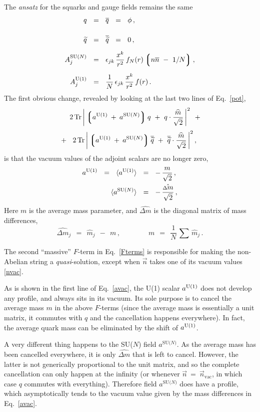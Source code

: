 \documentclass[12pt]{article}
\def\beq{\begin{equation}}
\def\eeq{\end{equation}}
\newcommand{\wt}{\widetilde}
\newcommand{\ov}{\overline}
\newcommand{\lgr}{\left\lgroup}
\newcommand{\rgr}{\right\rgroup}
\newcommand{\aU}{a^{\rm U(1)}}
\newcommand{\aN}{a^\text{SU($N$)}}
\newcommand{\nnbar}{n\ov{n}}
\newcommand{\qt}{\wt{q}}
\newcommand{\bq}{\ov{q}}
\newcommand{\bqt}{\overline{\widetilde{q}}}
\newcommand{\Tr}{\text{Tr}}
\newcommand{\dm}{\hat{{\scriptstyle \Delta} m}}
\newcommand{\mhat}{\widehat{m}}
\newcommand{\nvac}{\vec{n}{}_\text{vac}}
\newcommand{\ansatz}{{\it ansatz} }
\begin{document}
	The \ansatz for the squarks and gauge fields remains the same
\begin{align}
%
\notag
	q    & ~~=~~    \bq    ~~=~~    \phi\,,    \\[4mm]
%
\notag
	\qt    & ~~=~~    \bqt    ~~=~~    0\,,    \\[2mm]
%
\label{qAansatz}
	A_j^\text{SU($N$)}    & ~~=~~    \epsilon_{jk}\, \frac{x^k}{r^2}\, f_N(r) \lgr \nnbar ~-~ 1/N \rgr ,
	\\[2mm]
%
\notag
	A_j^\text{U(1)}    & ~~=~~    \frac{1}{N}\, \epsilon_{jk}\, \frac{x^k}{r^2}\, f(r)\,.
\end{align}
	The first obvious change, revealed by looking at the last two lines of Eq.~\eqref{pot}, 
\begin{align}
%
\notag
	&
	\phantom{~~+~~}
	2\, \Tr\, \bigg| \lgr \aU \:+\: \aN \rgr q  ~+~  q \cdot \frac{\mhat}{\sqrt{2}} \,\bigg|^2
	~~+~~
	\\[1mm]
%
\label{Fterms}
	&
	~~+~~
	2\, \Tr\, \bigg| \lgr \aU \:+\: \aN \rgr \bqt  ~+~  \bqt \cdot \frac{\mhat}{\sqrt{2}} \,\bigg|^2
	\,,
\end{align}
	is that the vacuum values of the adjoint scalars are no longer zero,
\begin{align}
%
\notag
	\aU    ~~=~~    \langle \aU \rangle    & ~~=~~    -\, \frac{m}{\sqrt{2}}\,,
	\\
%
\label{avac}
	\langle \aN \rangle    & ~~=~~ -\, \frac{\dm}{\sqrt{2}}\,,
\end{align}
	Here $ m $ is the average mass parameter, and $ \dm $ is the diagonal matrix of mass differences,
\beq
	\dm{}_j    ~~=~~    \mhat{}_j  ~~-~~  m\,,
	\qquad\qquad
	m    ~~=~~ \frac{1}{N}\, \sum\, \mhat{}_j\,.
\eeq
	
	The second ``massive'' $ F $-term in Eq.~\eqref{Fterms} is responsible 
	for making the non-Abelian string a {\it quasi}-solution, 
	except when $ \vec{n} $ takes one of its vacuum values \eqref{nvac}.
	
	As is shown in the first line of Eq.~\eqref{avac}, the U(1) scalar $ \aU $ does not develop
	any profile, and always sits in its vacuum.
	Its sole purpose is to cancel the average mass $ m $ in the above $ F $-terms 
	(since the average mass is essentially a unit matrix, it commutes with $ q $ and the 
	cancellation happens everywhere). In fact, the average quark mass can be 
	eliminated by the shift of $ \aU $.

	A very different thing happens to the SU($N$) field $ \aN $.
	As the average mass has been cancelled everywhere, it is only $ \dm $ that is left to cancel.
	However, the latter is not generically proportional to the unit matrix, and so the complete cancellation
	can only happen at the infinity (or whenever $ \vec{n} ~=~ \nvac $, in which
	case $ q $ commutes with everything).
	Therefore field $ \aN $ does have a profile, 
	which asymptotically tends to the vacuum value given by the mass differences in Eq.~\eqref{avac}.
\end{document}
